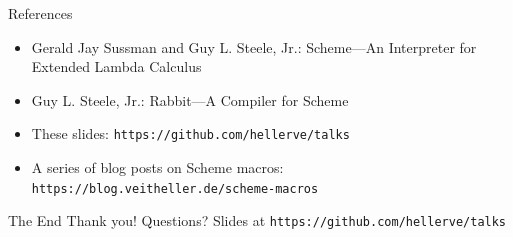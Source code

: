 \documentclass[aspectratio=169]{beamer}
\begin{document}
  \begin{frame}{References}
    \begin{itemize}
      \item Gerald Jay Sussman and Guy L. Steele, Jr.: Scheme—An Interpreter for Extended Lambda Calculus
      \item Guy L. Steele, Jr.: Rabbit—A Compiler for Scheme
      \item These slides: \texttt{https://github.com/hellerve/talks}
      \item A series of blog posts on Scheme macros: \texttt{https://blog.veitheller.de/scheme-macros}
    \end{itemize}
  \end{frame}
  \begin{frame}{The End}
    \Huge Thank you!
    \linebreak
    \linebreak
    \linebreak
    \small Questions?
    \linebreak
    \linebreak
    \tiny Slides at \texttt{https://github.com/hellerve/talks}
  \end{frame}
\end{document}
